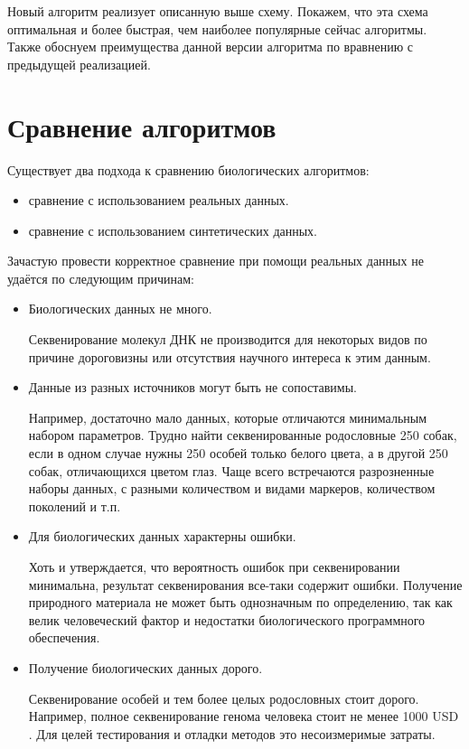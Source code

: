 \documentclass{matmex-diploma-custom}
\begin{document}
Новый алгоритм реализует описанную выше схему. Покажем, что эта схема
оптимальная и более быстрая, чем наиболее популярные сейчас
алгоритмы. Также обоснуем преимущества данной версии алгоритма по
вравнению с предыдущей реализацией.

\section{Сравнение алгоритмов}

Существует два подхода к сравнению биологических алгоритмов:
\begin{itemize}
\item сравнение с использованием реальных данных.
\item сравнение с использованием синтетических данных.
\end{itemize}

Зачастую провести корректное сравнение при помощи реальных данных не
удаётся по следующим причинам:

\begin{itemize}
\item Биологических данных не много.

  Секвенирование молекул ДНК не производится для некоторых видов по
  причине дороговизны или отсутствия научного интереса к этим данным.

\item Данные из разных источников могут быть не сопоставимы.

  Например, достаточно мало данных, которые отличаются минимальным
  набором параметров. Трудно найти секвенированные родословные 250
  собак, если в одном случае нужны 250 особей только белого цвета, а в
  другой 250 собак, отличающихся цветом глаз. Чаще всего встречаются
  разрозненные наборы данных, с разными количеством и видами маркеров,
  количеством поколений и т.п.

\item Для биологических данных характерны ошибки.

  Хоть и утверждается, что вероятность ошибок при секвенировании
  минимальна, результат секвенирования все-таки содержит
  ошибки. Получение природного материала не может быть однозначным по
  определению, так как велик человеческий фактор и недостатки
  биологического программного обеспечения.

\item Получение биологических данных дорого.

  Секвенирование особей и тем более целых родословных стоит
  дорого. Например, полное секвенирование генома человека стоит не
  менее 1000 USD \cite{kircher2010high}. Для целей тестирования и
  отладки методов это несоизмеримые затраты.

\end{itemize}
\end{document}
